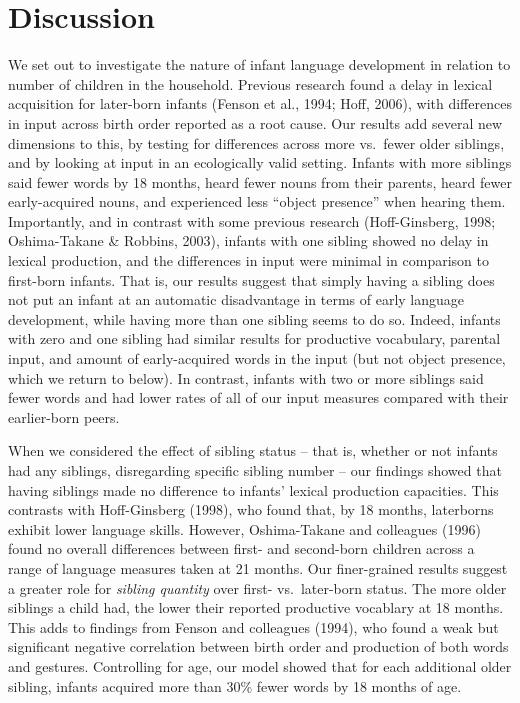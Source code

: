 \documentclass[
  english,
  man,floatsintext]{apa6}
\begin{document}
\hypertarget{discussion}{%
\section{Discussion}\label{discussion}}

We set out to investigate the nature of infant language development in relation to number of children in the household. Previous research found a delay in lexical acquisition for later-born infants (Fenson et al., 1994; Hoff, 2006), with differences in input across birth order reported as a root cause. Our results add several new dimensions to this, by testing for differences across more vs.~fewer older siblings, and by looking at input in an ecologically valid setting. Infants with more siblings said fewer words by 18 months, heard fewer nouns from their parents, heard fewer early-acquired nouns, and experienced less \enquote{object presence} when hearing them.
Importantly, and in contrast with some previous research (Hoff-Ginsberg, 1998; Oshima-Takane \& Robbins, 2003), infants with one sibling showed no delay in lexical production, and the differences in input were minimal in comparison to first-born infants. That is, our results suggest that simply having a sibling does not put an infant at an automatic disadvantage in terms of early language development, while having more than one sibling seems to do so. Indeed, infants with zero and one sibling had similar results for productive vocabulary, parental input, and amount of early-acquired words in the input (but not object presence, which we return to below). In contrast, infants with two or more siblings said fewer words and had lower rates of all of our input measures compared with their earlier-born peers.

When we considered the effect of sibling status -- that is, whether or not infants had any siblings, disregarding specific sibling number -- our findings showed that having siblings made no difference to infants' lexical production capacities. This contrasts with Hoff-Ginsberg (1998), who found that, by 18 months, laterborns exhibit lower language skills. However, Oshima-Takane and colleagues (1996) found no overall differences between first- and second-born children across a range of language measures taken at 21 months. Our finer-grained results suggest a greater role for \emph{sibling quantity} over first- vs.~later-born status. The more older siblings a child had, the lower their reported productive vocablary at 18 months. This adds to findings from Fenson and colleagues (1994), who found a weak but significant negative correlation between birth order and production of both words and gestures. Controlling for age, our model showed that for each additional older sibling, infants acquired more than 30\% fewer words by 18 months of age.
\end{document}
